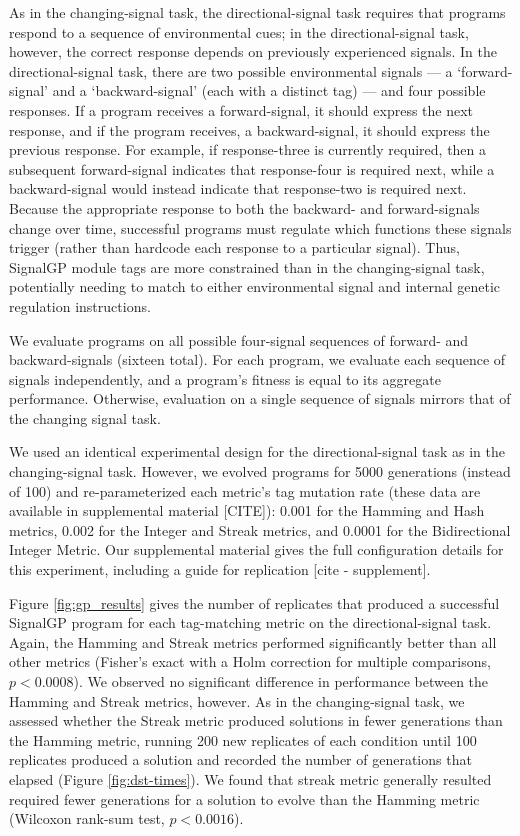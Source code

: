 As in the changing-signal task, the directional-signal task requires that programs respond to a sequence of environmental cues; in the directional-signal task, however, the correct response depends on previously experienced signals.
In the directional-signal task, there are two possible environmental signals --- a `forward-signal' and a `backward-signal' (each with a distinct tag) ---  and four possible responses.
If a program receives a forward-signal, it should express the next response, and if the program receives, a backward-signal, it should express the previous response.
For example, if response-three is currently required, then a subsequent forward-signal indicates that response-four is required next, while a backward-signal would instead indicate that response-two is required next.
Because the appropriate response to both the backward- and forward-signals change over time, successful programs must regulate which functions these signals trigger (rather than hardcode each response to a particular signal).
Thus, SignalGP module tags are more constrained than in the changing-signal task, potentially needing to match to either environmental signal and internal genetic regulation instructions.

We evaluate programs on all possible four-signal sequences of forward- and backward-signals (sixteen total).
For each program, we evaluate each sequence of signals independently, and a program's fitness is equal to its aggregate performance.
Otherwise, evaluation on a single sequence of signals mirrors that of the changing signal task.

We used an identical experimental design for the directional-signal task as in the changing-signal task. 
However, we evolved programs for 5000 generations (instead of 100) and re-parameterized each metric's tag mutation rate (these data are available in supplemental material [CITE]): 
0.001 for the Hamming and Hash metrics, 0.002 for the Integer and Streak metrics, and 0.0001 for the Bidirectional Integer Metric. 
Our supplemental material gives the full configuration details for this experiment, including a guide for replication [cite - supplement].

Figure \ref{fig:gp_results} gives the number of replicates that produced a successful SignalGP program for each tag-matching metric on the directional-signal task.
Again, the Hamming and Streak metrics performed significantly better than all other metrics (Fisher's exact with a Holm correction for multiple comparisons, $p < 0.0008$). We observed no significant difference in performance between the Hamming and Streak metrics, however.
As in the changing-signal task, we assessed whether the Streak metric produced solutions in fewer generations than the Hamming metric, running 200 new replicates of each condition until 100 replicates produced a solution and recorded the number of generations that elapsed (Figure \ref{fig:dst-times}).
We found that streak metric generally resulted required fewer generations for a solution to evolve than the Hamming metric (Wilcoxon rank-sum test, $p < 0.0016$).

